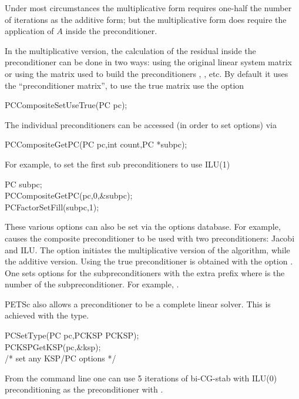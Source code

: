 Under most circumstances the multiplicative form requires one-half the number of
iterations as the additive form; but the multiplicative form does require 
the application of $ A $ inside the preconditioner. 

In the multiplicative version, the calculation of the residual inside the 
preconditioner can be done in two ways: using the original linear system matrix
or using the matrix used to build the preconditioners , , etc.
By default it uses the ``preconditioner matrix'', to use the true matrix use the 
option 
\begin{tabbing}
  PCCompositeSetUseTrue(PC pc);
\end{tabbing}

The individual 
preconditioners can be accessed (in order to set options) via
\begin{tabbing}
  PCCompositeGetPC(PC pc,int count,PC *subpc);
\end{tabbing}
For example, to set the first sub preconditioners to use ILU(1)
\begin{tabbing}
   PC subpc;\\
  PCCompositeGetPC(pc,0,\&subpc);\\
  PCFactorSetFill(subpc,1);
\end{tabbing}

These various options can also be set via the options database. For example,
    
 causes the composite preconditioner to be used with 
two preconditioners: Jacobi and ILU. The option  
 initiates the multiplicative version of the algorithm,
while   the additive version. Using the true
preconditioner is obtained with the option . 
 One sets options for the subpreconditioners with the 
extra prefix  where  is the number of the subpreconditioner.
For example,  .


PETSc also allows a preconditioner to be a complete linear solver. This is 
achieved with the  type. 
\begin{tabbing}
  PCSetType(PC pc,PCKSP PCKSP);\\
  PCKSPGetKSP(pc,\&ksp);\\
   /* set any KSP/PC options */
\end{tabbing}
 From the command line one can use 5 iterations of 
bi-CG-stab with ILU(0) preconditioning as the preconditioner with 
. 

